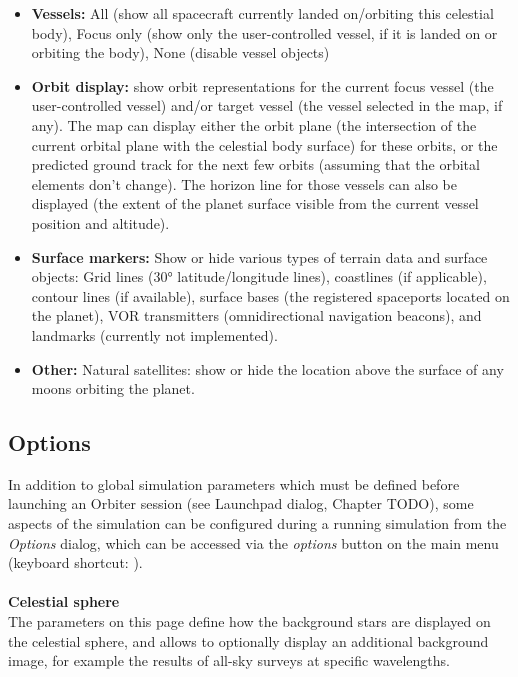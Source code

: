 \documentclass[Orbiter User Manual.tex]{subfiles}
\begin{document}
\begin{itemize}
\item \textbf{Vessels:} All (show all spacecraft currently landed on/orbiting this celestial body), Focus only (show only the user-controlled vessel, if it is landed on or orbiting the body), None (disable vessel objects)
\item \textbf{Orbit display:} show orbit representations for the current focus vessel (the user-controlled vessel) and/or target vessel (the vessel selected in the map, if any). The map can display either the orbit plane (the intersection of the current orbital plane with the celestial body surface) for these orbits, or the predicted ground track for the next few orbits (assuming that the orbital elements don’t change). The horizon line for those vessels can also be displayed (the extent of the planet surface visible from the current vessel position and altitude).
\item \textbf{Surface markers:} Show or hide various types of terrain data and surface objects: Grid lines (30° latitude/longitude lines), coastlines (if applicable), contour lines (if available), surface bases (the registered spaceports located on the planet), VOR transmitters (omnidirectional navigation beacons), and landmarks (currently not implemented).
\item \textbf{Other:} Natural satellites: show or hide the location above the surface of any moons orbiting the planet.
\end{itemize}


\subsection{Options}
In addition to global simulation parameters which must be defined before launching an Orbiter session (see Launchpad dialog, Chapter TODO), some aspects of the simulation can be configured during a running simulation from the \textit{Options} dialog, which can be accessed via the \textit{options} button on the main menu (keyboard shortcut: ).\\
\\
\textbf{Celestial sphere}\\
The parameters on this page define how the background stars are displayed on the celestial sphere, and allows to optionally display an additional background image, for example the results of all-sky surveys at specific wavelengths.

\begin{figure}[H]
	\centering
\end{figure}
\end{document}
